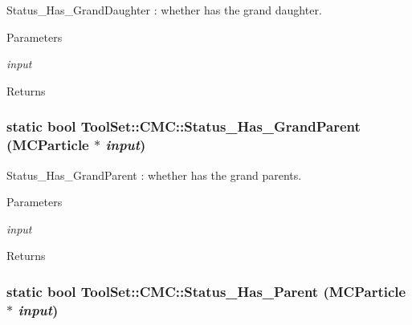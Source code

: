 Status\_\-Has\_\-GrandDaughter : whether has the grand daughter. 
\begin{DoxyParams}{Parameters}
\item[{\em input}]\end{DoxyParams}
\begin{DoxyReturn}{Returns}

\end{DoxyReturn}
\hypertarget{classToolSet_1_1CMC_a88ff52dd7c66369b43eb8619a1383e7d}{
\subsubsection[{Status\_\-Has\_\-GrandParent}]{\setlength{\rightskip}{0pt plus 5cm}static bool ToolSet::CMC::Status\_\-Has\_\-GrandParent (MCParticle $\ast$ {\em input})}}
\label{classToolSet_1_1CMC_a88ff52dd7c66369b43eb8619a1383e7d}


Status\_\-Has\_\-GrandParent : whether has the grand parents. 
\begin{DoxyParams}{Parameters}
\item[{\em input}]\end{DoxyParams}
\begin{DoxyReturn}{Returns}

\end{DoxyReturn}
\hypertarget{classToolSet_1_1CMC_acd1cf4b7527b2e2bd194ad688b29b132}{
\subsubsection[{Status\_\-Has\_\-Parent}]{\setlength{\rightskip}{0pt plus 5cm}static bool ToolSet::CMC::Status\_\-Has\_\-Parent (MCParticle $\ast$ {\em input})}}
\label{classToolSet_1_1CMC_acd1cf4b7527b2e2bd194ad688b29b132}


